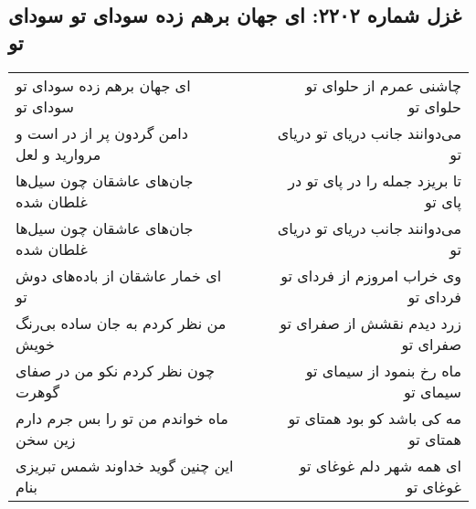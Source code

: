 \begin{center}
\section*{غزل شماره ۲۲۰۲: ای جهان برهم زده سودای تو سودای تو}
\label{sec:2202}
\begin{longtable}{l p{0.5cm} r}
ای جهان برهم زده سودای تو سودای تو
&&
چاشنی عمرم از حلوای تو حلوای تو
\\
دامن گردون پر از در است و مروارید و لعل
&&
می‌دوانند جانب دریای تو دریای تو
\\
جان‌های عاشقان چون سیل‌ها غلطان شده
&&
تا بریزد جمله را در پای تو در پای تو
\\
جان‌های عاشقان چون سیل‌ها غلطان شده
&&
می‌دوانند جانب دریای تو دریای تو
\\
ای خمار عاشقان از باده‌های دوش تو
&&
وی خراب امروزم از فردای تو فردای تو
\\
من نظر کردم به جان ساده بی‌رنگ خویش
&&
زرد دیدم نقشش از صفرای تو صفرای تو
\\
چون نظر کردم نکو من در صفای گوهرت
&&
ماه رخ بنمود از سیمای تو سیمای تو
\\
ماه خواندم من تو را بس جرم دارم زین سخن
&&
مه کی باشد کو بود همتای تو همتای تو
\\
این چنین گوید خداوند شمس تبریزی بنام
&&
ای همه شهر دلم غوغای تو غوغای تو
\\
\end{longtable}
\end{center}
